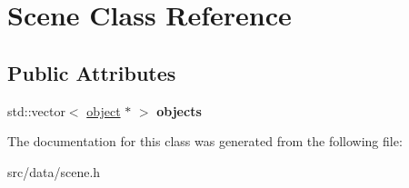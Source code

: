 \hypertarget{class_scene}{}\section{Scene Class Reference}
\label{class_scene}
\subsection*{Public Attributes}
\begin{DoxyCompactItemize}
\item 
\hypertarget{class_scene_a38f38b548cb48d69b3225fa930d5c31b}{}std\+::vector$<$ \hyperlink{structobject}{object} $\ast$ $>$ {\bfseries objects}\label{class_scene_a38f38b548cb48d69b3225fa930d5c31b}

\end{DoxyCompactItemize}


The documentation for this class was generated from the following file\+:\begin{DoxyCompactItemize}
\item 
src/data/scene.\+h\end{DoxyCompactItemize}
